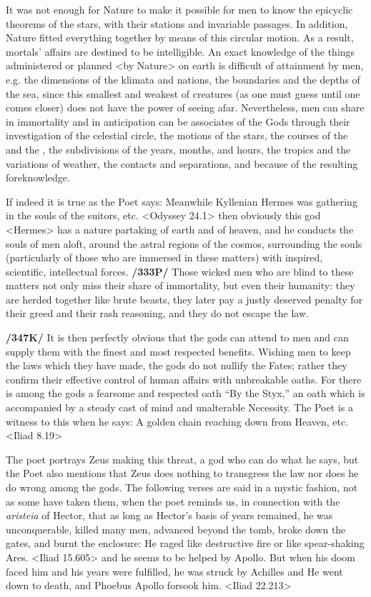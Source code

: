 It was not enough for Nature to make it possible for men to know the epicyclic theorems of the stars, with their stations and invariable passages. In addition, Nature fitted everything together by means of this circular motion. As a result, mortals’ affairs are destined to be intelligible. An exact knowledge of the things administered or planned <by Nature> on earth is difficult of attainment by men, e.g. the dimensions of the klimata and nations, the boundaries and the depths of the sea, since this smallest and weakest of creatures (as one must guess until one comes closer) does not have the power of seeing afar. Nevertheless, men can share in immortality and in anticipation can be associates of the Gods through their investigation of the celestial circle, the motions of the stars, the courses of the \Sun\, and the \Moon, the subdivisions of the years, months, and hours, the tropics and the variations of weather, the contacts and separations, and because of the resulting foreknowledge.

 
If indeed it is true as the Poet says: Meanwhile Kyllenian Hermes was gathering in the souls of the suitors, etc. <Odyssey 24.1> then obviously this god <Hermes> has a nature partaking of earth and of heaven, and he conducts the souls of men aloft, around the astral regions of the cosmos, surrounding the souls (particularly of those who are immersed in these matters) with inspired, scientific, intellectual forces. \textbf{/333P/} Those wicked men who are blind to these matters not only miss their share of immortality, but even their humanity: they are herded together like brute beasts, they later pay a justly deserved penalty for their greed and their rash reasoning, and they do not escape the law.

\textbf{/347K/} It is then perfectly obvious that the gods can attend to men and can supply them with the finest and most respected benefits. Wishing men to keep the laws which they have made, the gods do not nullify the Fates; rather they confirm their effective control of human affairs with unbreakable oaths. For there is among the gods a fearsome and respected oath “By the Styx,” an oath which is accompanied by a steady cast of mind and unalterable Necessity. The Poet is a witness to this when he says: A golden chain reaching down from Heaven, etc. <Iliad 8.19>

The poet portrays Zeus making this threat, a god who can do what he says, but the Poet also mentions that Zeus does nothing to transgress the law nor does he do wrong among the gods. The following verses are said in a mystic fashion, not as some have taken them, when the poet reminds us, in connection with the \textit{aristeia} of Hector, that as long as Hector’s basis of years remained, he was unconquerable, killed many men, advanced beyond the tomb, broke down the gates, and burnt the enclosure: He raged like destructive fire or like spear-shaking Ares. <Iliad 15.605> and he seems to be helped by Apollo. But when his doom faced him and his years were fulfilled, he was struck by Achilles and He went down to death, and Phoebus Apollo forsook him. <Iliad 22.213>

